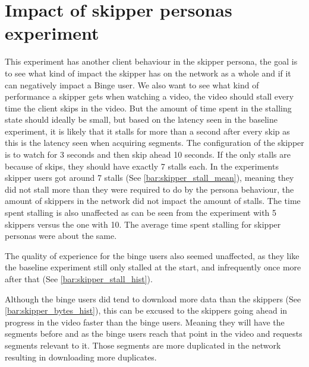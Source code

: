 \section{Impact of skipper personas experiment}
This experiment has another client behaviour in the skipper persona, the goal is to see what kind of impact the skipper has on the network as a whole and if it can negatively impact a Binge user. We also want to see what kind of performance a skipper gets when watching a video, the video should stall every time the client skips in the video. But the amount of time spent in the stalling state should ideally be small, but based on the latency seen in the baseline experiment, it is likely that it stalls for more than a second after every skip as this is the latency seen when acquiring segments. The configuration of the skipper is to watch for 3 seconds and then skip ahead 10 seconds. If the only stalls are because of skips, they should have exactly 7 stalls each.
In the experiments skipper users got around 7 stalls (See \autoref{bar:skipper_stall_mean}), meaning they did not stall more than they were required to do by the persona behaviour, the amount of skippers in the network did not impact the amount of stalls. The time spent stalling is also unaffected as can be seen from the experiment with 5 skippers versus the one with 10. The average time spent stalling for skipper personas were about the same.

The quality of experience for the binge users also seemed unaffected, as they like the baseline experiment still only stalled at the start, and infrequently once more after that (See \autoref{bar:skipper_stall_hist}). 

Although the binge users did tend to download more data than the skippers (See \autoref{bar:skipper_bytes_hist}), this can be excused to the skippers going ahead in progress in the video faster than the binge users. Meaning they will have the segments before and as the binge users reach that point in the video and requests segments relevant to it. Those segments are more duplicated in the network resulting in downloading more duplicates.


